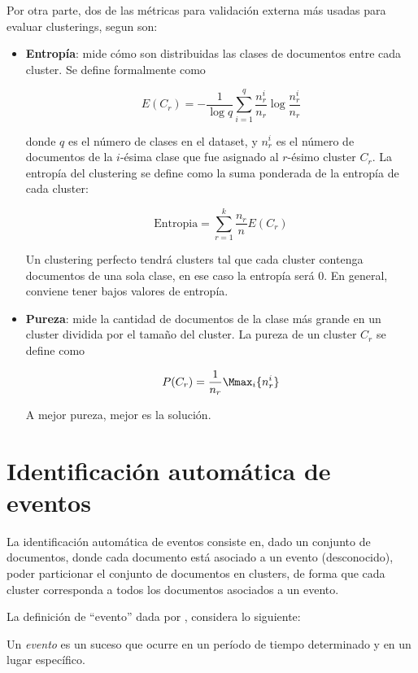 \documentclass[upright, contnum]{umemoria}
\begin{document}
    Por otra parte, dos de las métricas para validación externa más
    usadas para evaluar clusterings, segun
    \cite{Zhao02criterionfunctions} son:

\begin{itemize}
\item \textbf{Entropía}: mide cómo son distribuidas las clases de documentos
      entre cada cluster. Se define formalmente como
      
      $$E(C_r) = -\frac{1}{\log q}\sum_{i=1}^q\frac{n^i_r}{n_r}\log\frac{n^i_r}{n_r}$$

      donde $q$ es el número de clases en el dataset, y $n^i_r$ es el
      número de documentos de la $i$-ésima clase que fue asignado al
      $r$-ésimo cluster $C_r$. La entropía del clustering se define
      como la suma ponderada de la entropía de cada cluster:

      $$\textrm{Entropia} = \sum_{r=1}^k \frac{n_r}{n} E(C_r)$$

      Un clustering perfecto tendrá clusters tal que cada cluster
      contenga documentos de una sola clase, en ese caso la entropía
      será 0. En general, conviene tener bajos valores de entropía.
\item \textbf{Pureza}: mide la cantidad de documentos de la clase más grande
      en un cluster dividida por el tamaño del cluster. La pureza de
      un cluster $C_r$ se define como

      $$P(C_r) = \frac{1}{n_r} \Mmax_i\{n^i_r\}$$

      A mejor pureza, mejor es la solución.
\end{itemize}
\section{Identificación automática de eventos}
\label{sec-2.3}


   La identificación automática de eventos consiste en, dado un
   conjunto de documentos, donde cada documento está asociado a un
   evento (desconocido), poder particionar el conjunto de
   documentos en clusters, de forma que cada cluster corresponda a
   todos los documentos asociados a un evento.

   La definición de ``evento'' dada por
   \cite{Yang:1999:LAD:630307.630471}, considera lo siguiente:

   \begin{defn} Un \emph{evento} es un suceso que ocurre en un período de tiempo
   determinado y en un lugar específico. \end{defn}
\end{document}
